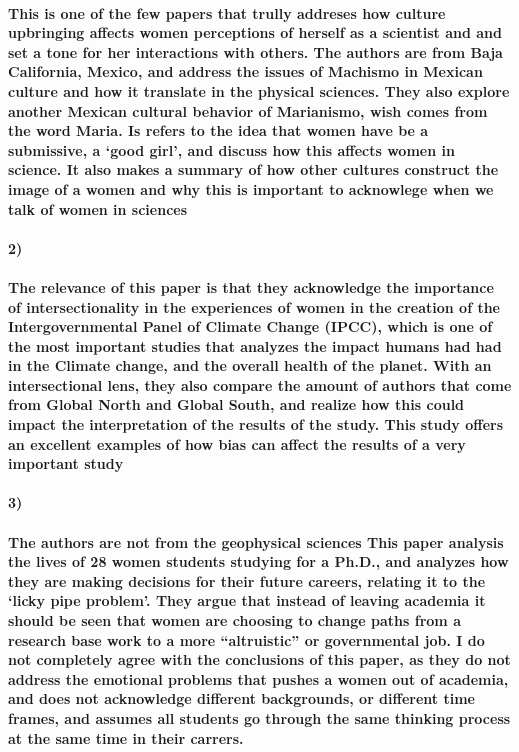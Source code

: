 \documentclass{tufte-handout}
\begin{document}
   \paragraph{
This is one of the few papers that trully addreses how culture upbringing affects women perceptions of herself as a scientist and and set a tone for her interactions with others. The authors are from Baja California, Mexico, and address the issues of Machismo in Mexican culture and how it  translate in the physical sciences. They also explore another Mexican cultural behavior of Marianismo, wish comes from the word Maria. Is refers to the idea that women have be a submissive, a `good girl', and discuss how this affects women in science. It also makes a summary of how other cultures construct the image of a women and why this is important to acknowlege when we talk of women in sciences} 

\paragraph{2)}
   
   \paragraph{
 The relevance of this paper is that they acknowledge the importance of intersectionality in the experiences of women in the creation of the Intergovernmental Panel of Climate Change (IPCC), which is one of the most important studies that analyzes the impact humans had had in the Climate change, and the overall health of the planet. With an intersectional lens, they also compare the amount of authors that come from Global North and Global South, and realize how this could impact the interpretation of the results of the study. This study offers an excellent examples of how bias can affect the results of a very important study}

\paragraph{3)}
   
   \paragraph{
The authors are not from the geophysical sciences
This paper analysis the lives of 28 women students studying for a Ph.D., and analyzes  how they are making decisions for their future careers, relating it to the `licky pipe problem'. They argue that instead of leaving academia it should be seen that women are choosing to change paths from a research base work to a more “altruistic” or governmental job. I do not completely agree with the conclusions of this paper, as they do not address the emotional problems that pushes a women out of academia, and does not acknowledge different backgrounds, or different time frames, and assumes all students go through the same thinking process at the same time in their carrers.} 
\end{document}
